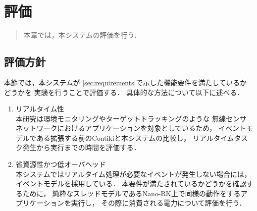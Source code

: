\chapter{評価}
\begin{large}
\begin{quote}
本章では，本システムの評価を行う．
\end{quote}
\end{large}
\clearpage

\section{評価方針}
本節では，本システムが
\ref{sec:requirements}で示した機能要件を満たしているかどうかを
実験を行うことで評価する．
具体的な方法について以下に述べる．


\begin{enumerate}
\item{リアルタイム性}\\
本研究は環境モニタリングやターゲットトラッキングのような
無線センサネットワークにおけるアプリケーションを対象としているため，
イベントモデルである拡張する前のContikiと本システムの比較し，
リアルタイムタスク発生から実行までの時間を評価する．
\newline
\item{省資源性かつ低オーバヘッド}\\
本システムではリアルタイム処理が必要なイベントが発生しない場合には，
イベントモデルを採用している．
本要件が満たされているかどうかを確認するために，
純粋なスレッドモデルであるNano-RK上で同様の動作をするアプリケーションを実行し，
その際に消費される電力について評価を行う．
\end{enumerate}




%

